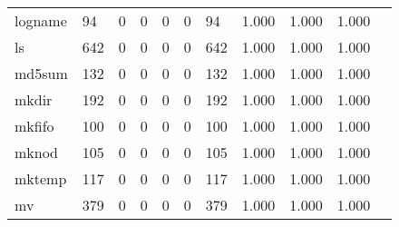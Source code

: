 \begin{longtable}{lp{1.10cm}p{1.10cm}p{1.10cm}p{1.10cm}p{1.10cm}p{1.10cm}p{1.10cm}p{1.10cm}p{1.10cm}p{1.10cm}}
logname   &                     94 &                                  0 &                                 0 &                                0 &                                 0 &                              94 &                          1.000 &                                 1.000 &                               1.000 \\
ls        &                    642 &                                  0 &                                 0 &                                0 &                                 0 &                             642 &                          1.000 &                                 1.000 &                               1.000 \\
md5sum    &                    132 &                                  0 &                                 0 &                                0 &                                 0 &                             132 &                          1.000 &                                 1.000 &                               1.000 \\
mkdir     &                    192 &                                  0 &                                 0 &                                0 &                                 0 &                             192 &                          1.000 &                                 1.000 &                               1.000 \\
mkfifo    &                    100 &                                  0 &                                 0 &                                0 &                                 0 &                             100 &                          1.000 &                                 1.000 &                               1.000 \\
mknod     &                    105 &                                  0 &                                 0 &                                0 &                                 0 &                             105 &                          1.000 &                                 1.000 &                               1.000 \\
mktemp    &                    117 &                                  0 &                                 0 &                                0 &                                 0 &                             117 &                          1.000 &                                 1.000 &                               1.000 \\
mv        &                    379 &                                  0 &                                 0 &                                0 &                                 0 &                             379 &                          1.000 &                                 1.000 &                               1.000 \\

\end{longtable}
